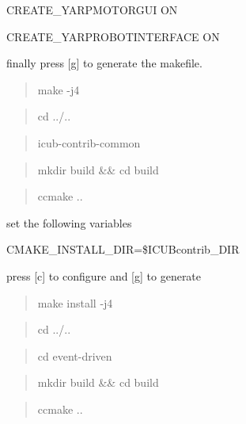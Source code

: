 \begin{DoxyItemize}
\item C\+R\+E\+A\+T\+E\+\_\+\+Y\+A\+R\+P\+M\+O\+T\+O\+R\+G\+UI ON
\item C\+R\+E\+A\+T\+E\+\_\+\+Y\+A\+R\+P\+R\+O\+B\+O\+T\+I\+N\+T\+E\+R\+F\+A\+CE ON
\end{DoxyItemize}

finally press \mbox{[}g\mbox{]} to generate the makefile.

\begin{quote}
make -\/j4 \end{quote}


\begin{quote}
cd ../.. \end{quote}


\begin{quote}
icub-\/contrib-\/common \end{quote}


\begin{quote}
mkdir build \&\& cd build \end{quote}


\begin{quote}
ccmake .. \end{quote}


set the following variables


\begin{DoxyItemize}
\item C\+M\+A\+K\+E\+\_\+\+I\+N\+S\+T\+A\+L\+L\+\_\+\+D\+IR=\$\+I\+C\+U\+Bcontrib\+\_\+\+D\+IR
\end{DoxyItemize}

press \mbox{[}c\mbox{]} to configure and \mbox{[}g\mbox{]} to generate

\begin{quote}
make install -\/j4 \end{quote}


\begin{quote}
cd ../.. \end{quote}


\begin{quote}
cd event-\/driven \end{quote}


\begin{quote}
mkdir build \&\& cd build \end{quote}


\begin{quote}
ccmake .. \end{quote}


